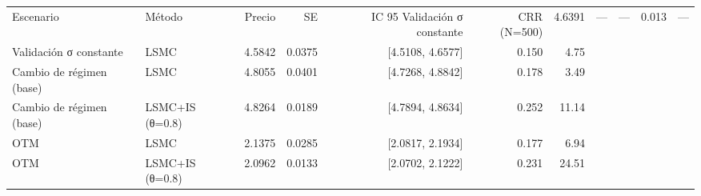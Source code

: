 \begin{tabular}{p{3.2cm}p{3.2cm}rrrrr}
\toprule
Escenario & Método & Precio & SE & IC 95%
\midrule
Validación σ constante & CRR (N=500) & 4.6391 & --- & --- & 0.013 & --- \\
Validación σ constante & LSMC & 4.5842 & 0.0375 & [4.5108, 4.6577] & 0.150 & 4.75 \\
Cambio de régimen (base) & LSMC & 4.8055 & 0.0401 & [4.7268, 4.8842] & 0.178 & 3.49 \\
Cambio de régimen (base) & LSMC+IS (θ=0.8) & 4.8264 & 0.0189 & [4.7894, 4.8634] & 0.252 & 11.14 \\
OTM & LSMC & 2.1375 & 0.0285 & [2.0817, 2.1934] & 0.177 & 6.94 \\
OTM & LSMC+IS (θ=0.8) & 2.0962 & 0.0133 & [2.0702, 2.1222] & 0.231 & 24.51 \\
\bottomrule
\end{tabular}
